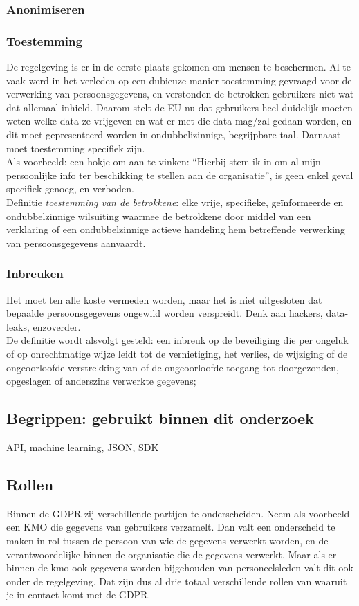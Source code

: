 \subsubsection{Anonimiseren}

\subsubsection{Toestemming} 
De regelgeving is er in de eerste plaats gekomen om mensen te beschermen. Al te vaak werd in het verleden op een dubieuze manier toestemming gevraagd voor de verwerking van persoonsgegevens, en verstonden de betrokken gebruikers niet wat dat allemaal inhield. Daarom stelt de EU nu dat gebruikers heel duidelijk moeten weten welke data ze vrijgeven en wat er met die data mag/zal gedaan worden, en dit moet gepresenteerd worden in ondubbelizinnige, begrijpbare taal.
Darnaast moet toestemming specifiek zijn.
\\ Als voorbeeld: een hokje om aan te vinken: “Hierbij stem ik in om al mijn persoonlijke info ter beschikking te stellen aan de organisatie”, is geen enkel geval specifiek genoeg, en verboden.\\ Definitie \textit{toestemming van de betrokkene}: elke vrije, specifieke, geïnformeerde en ondubbelzinnige wilsuiting waarmee de betrokkene door middel van een verklaring of een ondubbelzinnige actieve handeling hem betreffende verwerking van persoonsgegevens aanvaardt. 


\subsubsection{Inbreuken} 
Het moet ten alle koste vermeden worden, maar het is niet uitgesloten dat bepaalde persoonsgegevens ongewild worden verspreidt. Denk aan hackers, data-leaks, enzoverder.
\\ De definitie wordt alsvolgt gesteld: een inbreuk op de beveiliging die per ongeluk of op onrechtmatige wijze leidt tot de vernietiging, het verlies, de wijziging of de ongeoorloofde verstrekking van of de ongeoorloofde toegang tot doorgezonden, opgeslagen of anderszins verwerkte gegevens; 

\subsection{Begrippen: gebruikt binnen dit onderzoek}
API, machine learning, JSON, SDK 

\subsection{Rollen}
Binnen de GDPR zij verschillende partijen te onderscheiden. Neem als voorbeeld een KMO die gegevens van gebruikers verzamelt. Dan valt een onderscheid te maken in rol tussen de persoon van wie de gegevens verwerkt worden, en de verantwoordelijke binnen de organisatie die de gegevens verwerkt. Maar als er binnen de kmo ook gegevens worden bijgehouden van personeelsleden valt dit ook onder de regelgeving. Dat zijn dus al drie totaal verschillende rollen van waaruit je in contact komt met de GDPR. 

